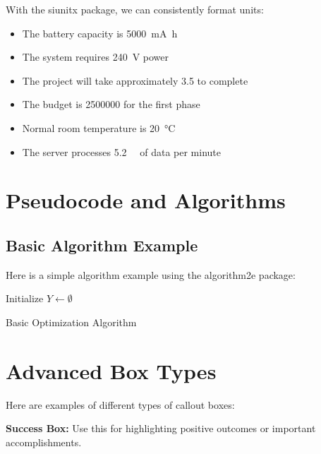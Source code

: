 \documentclass[a4paper,11pt]{article}
\begin{document}
With the siunitx package, we can consistently format units:

\begin{itemize}
    \item The battery capacity is \SI{5000}{\milli\ampere\hour}
    \item The system requires \SI{240}{\volt} power
    \item The project will take approximately \SI{3.5}{\year} to complete
    \item The budget is \SI{2500000}{\USD} for the first phase
    \item Normal room temperature is \SI{20}{\celsius}
    \item The server processes \SI{5.2}{\giga\byte} of data per minute
\end{itemize}

\section{Pseudocode and Algorithms}
\label{sec:algorithms}

\subsection{Basic Algorithm Example}

Here is a simple algorithm example using the algorithm2e package:

\begin{algorithm}[H]
	\SetAlgoLined
	Initialize $Y \gets \emptyset$\;
	\;
	\caption{Basic Optimization Algorithm}
\end{algorithm}

\section{Advanced Box Types}
\label{sec:boxes}

Here are examples of different types of callout boxes:

\begin{successbox}
\textbf{Success Box:} Use this for highlighting positive outcomes or important accomplishments.
\end{successbox}
\end{document}
